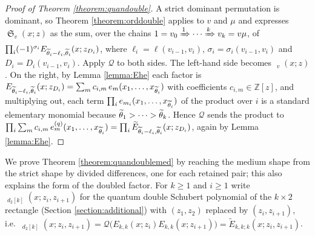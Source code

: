 \documentclass{amsart}
\theoremstyle{definition}
\theoremstyle{remark}
\numberwithin{equation}{section}
\DeclareMathOperator{\sch}{\mathfrak{S}}
\DeclareMathOperator{\qsch}{\widetilde{\mathfrak{S}}}
\newcommand{\qelem}{\widetilde{E}}
\begin{document}
\begin{proof}[Proof of Theorem \ref{theorem:quandouble}]
A strict dominant permutation is dominant, so Theorem \ref{theorem:orddouble} applies to $v$ and $\mu$ and expresses $\sch_v(x;z)$ as the sum, over the chains $1=v_0\xRightarrow{1}\cdots\xRightarrow{k}v_k=v\mu$, of $\prod_i(-1)^{\sigma_i}E_{\widetilde{\theta}_i-\ell_i,\widetilde{\theta}_i}(x;z_{D_i})$, where $\ell_i=\ell(v_{i-1},v_i)$, $\sigma_i=\sigma_i(v_{i-1},v_i)$ and $D_i=D_i(v_{i-1},v_i)$. Apply $\mathcal Q$ to both sides. The left-hand side becomes $\qsch_v(x;z)$. On the right, by Lemma \ref{lemma:Ehe} each factor is $E_{\widetilde{\theta}_i-\ell_i,\widetilde{\theta}_i}(x;z_{D_i})=\sum_{m}c_{i,m}\,e_m(x_1,\ldots,x_{\widetilde{\theta}_i})$ with coefficients $c_{i,m}\in\mathbb Z[z]$, and multiplying out, each term $\prod_ie_{m_i}(x_1,\ldots,x_{\widetilde{\theta}_i})$ of the product over $i$ is a standard elementary monomial because $\widetilde{\theta}_1>\cdots>\widetilde{\theta}_k$. Hence $\mathcal Q$ sends the product to $\prod_i\sum_mc_{i,m}\,e^{(q)}_m(x_1,\ldots,x_{\thop_i})=\prod_i\qelem_{\thop_i-\ell_i,\thop_i}(x;z_{D_i})$, again by Lemma \ref{lemma:Ehe}.
\end{proof}

We prove Theorem \ref{theorem:quandoublemed} by reaching the medium shape from the strict shape by divided differences, one for each retained pair; this also explains the form of the doubled factor. For $k\geq1$ and $i\geq1$ write $\qsch_{d_2[k]}(x;z_i,z_{i+1})$ for the quantum double Schubert polynomial of the $k\times2$ rectangle (Section \ref{section:additional}) with $(z_1,z_2)$ replaced by $(z_i,z_{i+1})$, i.e.\ $\qsch_{d_2[k]}(x;z_i,z_{i+1})=\mathcal Q\big(E_{k,k}(x;z_i)E_{k,k}(x;z_{i+1})\big)=\qelem_{k,k;k}(x;z_i,z_{i+1})$.
\end{document}
